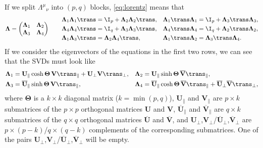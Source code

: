 \documentclass[11pt]{article}
\newcommand{\U}{\mathbf{U}}
\newcommand{\V}{\mathbf{V}}
\newcommand{\Ub}{\overline{\U}}
\newcommand{\Vb}{\overline{\V}}
\newcommand{\Lambdab}{\boldsymbol{\Lambda}}
\newcommand{\Thetab}{\boldsymbol{\Theta}}
\begin{document}
If we split \(\Lambda^\mu{}_\nu\) into \((p,q)\) blocks, \cref{eq:lorentz} means that
%
\begin{equation}\label{eq:blocklorentz}
  \Lambdab = 
    \begin{pmatrix}
      \Lambdab_1 & \Lambdab_2 \\
      \Lambdab_3 & \Lambdab_4
    \end{pmatrix}
  \qquad
\begin{aligned}
  \Lambdab_1 \Lambdab_1\trans &= \I_p + \Lambdab_2 \Lambdab_2\trans, &
  \Lambdab_1\trans \Lambdab_1 &= \I_p + \Lambdab_3\trans \Lambdab_3, \\
  \Lambdab_4 \Lambdab_4\trans &= \I_q + \Lambdab_3 \Lambdab_3\trans, &
  \Lambdab_4\trans \Lambdab_4 &= \I_q + \Lambdab_2\trans \Lambdab_2, \\
  \Lambdab_1 \Lambdab_3\trans &= \Lambdab_2 \Lambdab_4\trans, &
  \Lambdab_1\trans \Lambdab_2 &= \Lambdab_3\trans \Lambdab_4.
\end{aligned}
\end{equation}
%
If we consider the eigenvectors of the equations in the first two rows, we can see that the SVDs must look like
%
\begin{equation*}
\begin{aligned}
  \Lambdab_1  &= \U_\parallel \cosh \Thetab\, \V\trans_\parallel 
              +  \U_\perp \V\trans_\perp, &
  \Lambdab_2  &= \U_\parallel \sinh \Thetab\, \Vb\trans_\parallel, \\
  \Lambdab_3  &= \Ub_\parallel \sinh \Thetab\, \V\trans_\parallel, &
  \Lambdab_4  &= \Ub_\parallel \cosh \Thetab\, \Vb\trans_\parallel 
              +  \Ub_\perp \Vb\trans_\perp,
\end{aligned}
\end{equation*}
%
where \(\Thetab\) is a \(k \times k\) diagonal matrix (\(k = \min(p,q)\)), 
\(\U_\parallel\) and \(\V_\parallel\) are \(p \times k\) submatrices of the \(p \times p\) orthogonal matrices \(\U\) and \(\V\), 
\(\Ub_\parallel\) and \(\Vb_\parallel\) are \(q \times k\) submatrices of the \(q \times q\) orthogonal matrices \(\Ub\) and \(\Vb\), 
and \(\U_\perp\),\(\V_\perp\)/\(\Ub_\perp\),\(\Vb_\perp\) are \(p \times (p-k)\)/\(q \times (q-k)\)  complements of the corresponding submatrices.
One of the pairs \(\U_\perp\),\(\V_\perp\)/\(\Ub_\perp\),\(\Vb_\perp\) will be empty.
\end{document}
